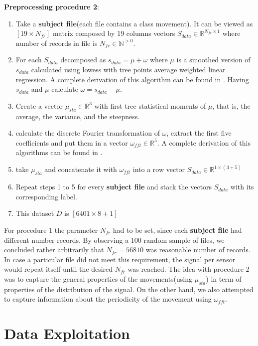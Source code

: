 \textbf{Preprocessing procedure 2}:
\begin{enumerate}
	\item Take a \textbf{subject file}(each file contains a class movement). It can be viewed as $[19 \times N_{fr}]$ matrix composed by 19 columns vectors $S_{data} \in \mathbb{R}^{N_{fr} \times 1}$  where number of records in file is $N_{fr} \in \mathbb{N}^{>0}$.
	\item For each $S_{data}$ decomposed as $s_{data}=\mu+\omega$ where $\mu$ is a smoothed version of $s_{data}$ calculated using lowess with tree points average weighted linear regression. A complete derivation of this algorithm can be found in \cite{1}. Having $s_{data}$ and $\mu$ calculate $\omega =s_{data}-\mu$. 
	\item Create a vector $\mu_{sta} \in \mathbb{R}^{3}$ with first tree statistical moments of $\mu$, that is, the average, the variance, and the steepness. 
	\item calculate the discrete Fourier transformation of $\omega$, extract the first five coefficients and put them in a vector $\omega_{fft} \in \mathbb{R}^{5}$. A complete derivation of this algorithms can be found in \cite{2}.
	\item take $\mu_{sta}$ and concatenate it with $\omega_{fft}$ into a row vector $S_{data} \in \mathbb{R}^{1 \times (3+5) }$
	\item Repeat steps 1 to 5 for every \textbf{subject file} and stack the vectors $S_{data}$ with its corresponding label.
	\item This dataset $D$ is $[6401 \times 8+1]$
\end{enumerate}

 For procedure 1 the parameter $N_{fr}$ had to be set, since each \textbf{subject file} had different number records. By observing a 100 random sample of files, we concluded rather arbitrarily that  $N_{fr}=56810$  was reasonable number of records. In case a particular file did not meet this requirement, the signal per sensor would repeat itself until the desired $N_{fr}$ was reached. The idea with procedure 2 was to capture the general properties of the movements(using $\mu_{sta}$) in term of properties of the distribution of the signal. On the other hand, we also attempted to capture information about the periodicity of the movement using $\omega_{fft}$. 


\section{Data Exploitation}

